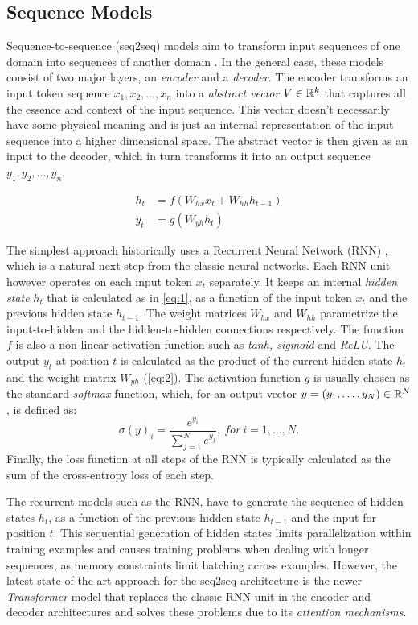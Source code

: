 \subsection{Sequence Models}
\label{sec:seq-classifiers:seq-models}

Sequence-to-sequence (seq2seq) models aim to transform input sequences of one
domain into sequences of another domain \citep{Sutskever_2014}. In the general
case, these models consist of two major layers, an \emph{encoder} and a
\emph{decoder}. The encoder transforms an input token sequence $x_1, x_2, \dots,
x_n$ into a \emph{abstract vector} $V \in \mathbb{R}^k$ that captures all the essence
and context of the input sequence. This vector doesn't necessarily have some
physical meaning and is just an internal representation of the input sequence
into a higher dimensional space. The abstract vector is then given as an input
to the decoder, which in turn transforms it into an output sequence $y_1, y_2,
\dots, y_n$.

\begin{align}
    h_t &= f(W_{hx} x_t + W_{hh} h_{t-1}) \label{eq:1} \\
    y_t &= g(W_{yh} h_t) \label{eq:2}
\end{align}

The simplest approach historically uses a Recurrent Neural Network (RNN)
\citep{Rumelhart1986, Werbos1990, Hochreiter_1997}, which is a natural next step
from the classic neural networks. Each RNN unit however operates on each input
token $x_t$ separately. It keeps an internal \emph{hidden state} $h_t$ that is
calculated as in \autoref{eq:1}, as a function of the input token $x_t$ and the
previous hidden state $h_{t-1}$. The weight matrices $W_{hx}$ and $W_{hh}$
parametrize the input-to-hidden and the hidden-to-hidden connections
respectively. The function $f$ is also a non-linear activation function such as
\emph{tanh, sigmoid} and \emph{ReLU}. The output $y_t$ at position $t$ is
calculated as the product of the current hidden state $h_t$ and the weight
matrix $W_{yh}$ (\autoref{eq:2}). The activation function $g$ is usually chosen
as the standard \emph{softmax} function, which, for an output vector $y = (y_1,
\dots, y_N) \in \mathbb{R}^{N}$, is defined as:
\[ \sigma(y)_i = \frac{e^{y_i}}{\sum_{j=1}^{N} e^{y_j}},\ for\ i = 1, \dots, N.
\] Finally, the loss function at all steps of the RNN is typically calculated
as the sum of the cross-entropy loss of each step.

The recurrent models such as the RNN, have to generate the sequence of hidden
states $h_t$, as a function of the previous hidden state $h_{t-1}$ and the input
for position $t$. This sequential generation of hidden states limits
parallelization within training examples and causes training problems when
dealing with longer sequences, as memory constraints limit batching across
examples. However, the latest state-of-the-art approach for the seq2seq
architecture is the newer \emph{Transformer} model \citep{Vaswani_2017} that
replaces the classic RNN unit in the encoder and decoder architectures and
solves these problems due to its \emph{attention mechanisms}.

